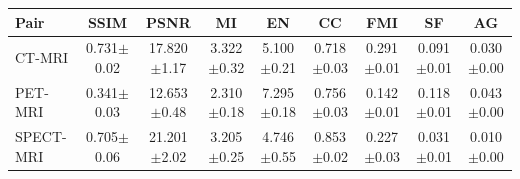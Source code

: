\begin{tabular}{lcccccccc}
\hline
Pair & SSIM & PSNR & MI & EN & CC & FMI & SF & AG \\
\hline
CT-MRI & 0.731$\pm$0.02 & 17.820$\pm$1.17 & 3.322$\pm$0.32 & 5.100$\pm$0.21 & 0.718$\pm$0.03 & 0.291$\pm$0.01 & 0.091$\pm$0.01 & 0.030$\pm$0.00 \\
PET-MRI & 0.341$\pm$0.03 & 12.653$\pm$0.48 & 2.310$\pm$0.18 & 7.295$\pm$0.18 & 0.756$\pm$0.03 & 0.142$\pm$0.01 & 0.118$\pm$0.01 & 0.043$\pm$0.00 \\
SPECT-MRI & 0.705$\pm$0.06 & 21.201$\pm$2.02 & 3.205$\pm$0.25 & 4.746$\pm$0.55 & 0.853$\pm$0.02 & 0.227$\pm$0.03 & 0.031$\pm$0.01 & 0.010$\pm$0.00 \\
\hline
\end{tabular}
